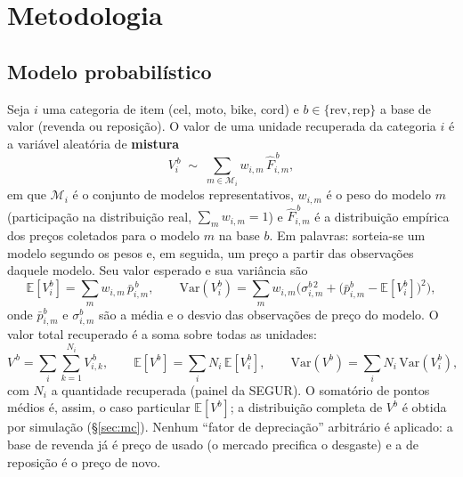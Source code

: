 \documentclass[11pt,a4paper]{article}
\begin{document}
\section{Metodologia}

\subsection{Modelo probabilístico}
Seja $i$ uma categoria de item ($\text{cel}$, $\text{moto}$, $\text{bike}$, $\text{cord}$) e
$b\in\{\text{rev},\text{rep}\}$ a base de valor (revenda ou reposição). O valor de uma unidade
recuperada da categoria $i$ é a variável aleatória de \textbf{mistura}
\begin{equation}
  V_i^{\,b}\;\sim\;\sum_{m\in\mathcal{M}_i} w_{i,m}\,\hat F_{i,m}^{\,b},
  \label{eq:mix}
\end{equation}
em que $\mathcal{M}_i$ é o conjunto de modelos representativos, $w_{i,m}$ é o peso do modelo $m$
(participação na distribuição real, $\sum_m w_{i,m}=1$) e $\hat F_{i,m}^{\,b}$ é a distribuição
empírica dos preços coletados para o modelo $m$ na base $b$. Em palavras: sorteia-se um modelo
segundo os pesos e, em seguida, um preço a partir das observações daquele modelo. Seu valor
esperado e sua variância são
\begin{equation}
  \mathbb{E}[V_i^{b}]=\sum_m w_{i,m}\,\bar p_{i,m}^{\,b},
  \qquad
  \mathrm{Var}(V_i^{b})=\sum_m w_{i,m}\Big(\sigma_{i,m}^{b\,2}+\big(\bar p_{i,m}^{b}-\mathbb{E}[V_i^b]\big)^2\Big),
  \label{eq:moments}
\end{equation}
onde $\bar p_{i,m}^{b}$ e $\sigma_{i,m}^{b}$ são a média e o desvio das observações de preço do
modelo. O valor total recuperado é a soma sobre todas as unidades:
\begin{equation}
  V^{\,b}=\sum_{i}\sum_{k=1}^{N_i} V_{i,k}^{\,b},
  \qquad
  \mathbb{E}[V^{b}]=\sum_i N_i\,\mathbb{E}[V_i^{b}],
  \qquad
  \mathrm{Var}(V^{b})=\sum_i N_i\,\mathrm{Var}(V_i^{b}),
  \label{eq:total}
\end{equation}
com $N_i$ a quantidade recuperada (painel da SEGUR). O somatório de pontos médios é, assim, o caso
particular $\mathbb{E}[V^b]$; a distribuição completa de $V^b$ é obtida por simulação
(§\ref{sec:mc}). Nenhum ``fator de depreciação'' arbitrário é aplicado: a base de revenda já é
preço de usado (o mercado precifica o desgaste) e a de reposição é o preço de novo.
\end{document}
